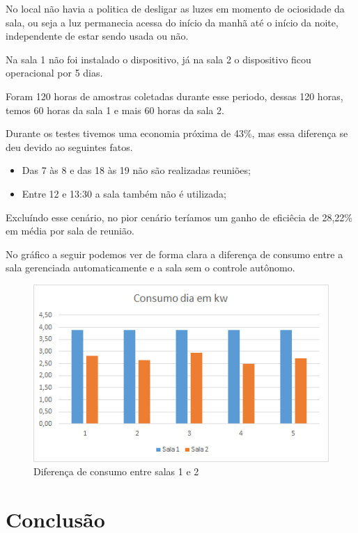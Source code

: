\documentclass[openright]{normas-utf-tex} %
\begin{document}
No local não havia a politica de desligar as luzes em momento de ociosidade da sala, ou seja a luz permanecia acessa do início da manhã até o início da noite, independente de estar sendo usada ou não. 

Na sala 1 não foi instalado o dispositivo, já na sala 2 o dispositivo ficou operacional por 5 dias.

Foram 120 horas de amostras coletadas durante esse periodo, dessas 120 horas, temos 60 horas da sala 1 e mais 60 horas da sala 2.

Durante os testes tivemos uma economia próxima de 43\%, mas essa diferença se deu devido ao seguintes fatos. 

\begin{itemize}
    \item Das 7 às 8 e das 18 às 19 não são realizadas reuniões;
    \item Entre 12 e 13:30 a sala também não é utilizada;
\end{itemize}

Excluíndo esse cenário, no pior cenário teríamos um ganho de eficiêcia de 28,22\% em média por sala de reunião.

No gráfico a seguir podemos ver de forma clara a diferença de consumo entre a sala gerenciada automaticamente e a sala sem o controle autônomo. 

\begin{figure}[!htb]
     \centering
     \includegraphics[scale=0.8]{g2.png}
     \caption{Diferença de consumo entre salas 1 e 2}
     \label{}
\end{figure}




\chapter{Conclusão}
\end{document}
